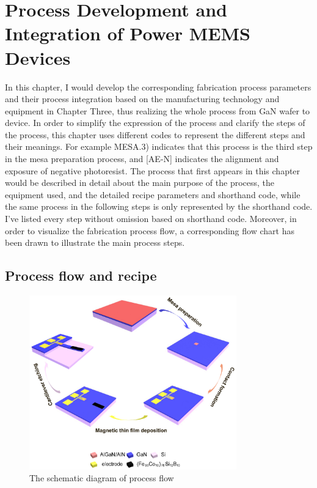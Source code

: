 
\chapter{Process Development and Integration of Power MEMS Devices}
\label{ch:Process Development and Integration of Power MEMS Devices}

\ifpdf
    \graphicspath{{Chapter7/Figs/Raster/}{Chapter7/Figs/PDF/}{Chapter6/Figs/}}
\else
    \graphicspath{{Chapter7/Figs/Vector/}{Chapter7/Figs/}}
\fi


In this chapter, I would develop the corresponding fabrication process parameters and their process integration based on the manufacturing technology and equipment in Chapter Three, thus realizing the whole process  from GaN wafer to device. In order to simplify the expression of the process and clarify the steps of the process, this chapter uses different codes to represent the different steps and their meanings. For example MESA.3) indicates that this process is the third step in the mesa preparation process, and [AE-N] indicates the alignment and exposure of negative photoresist. The process that first appears in this chapter would be described in detail about the main purpose of the process, the equipment used, and the detailed recipe parameters and shorthand code, while the same process in the following steps is only represented by the shorthand code. I've listed every step without omission based on shorthand code. Moreover, in order to visualize the fabrication process flow, a corresponding flow chart has been drawn to illustrate the main process steps.

\section{Process flow and recipe}

\begin{figure}[H] 
\centering    
\includegraphics[width=0.8\textwidth]{processflow}
\caption[The schematic diagram of process flow]{The schematic diagram of process flow}
\label{fig:processflow}
\end{figure}

